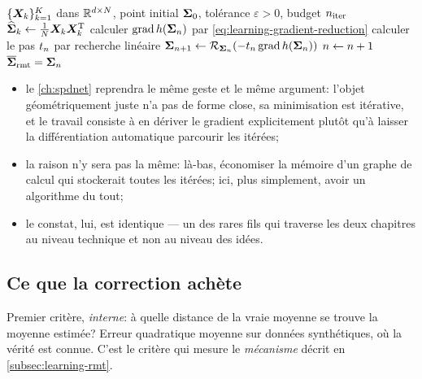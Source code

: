 \begin{algorithm}[htb]
  \caption{Moyenne de Fréchet corrigée par la théorie des matrices aléatoires}
  \label{alg:learning-frechet-rmt}
  \begin{algorithmic}[1]
    \Require $\{\boldsymbol{X}_k\}_{k=1}^{K}$ dans $\mathbb{R}^{d\times N}$,
      point initial $\boldsymbol{\Sigma}_0$, tolérance $\varepsilon>0$, budget $n_{\mathrm{iter}}$
      \State $\widehat{\boldsymbol{\Sigma}}_k\gets\frac{1}{N}\boldsymbol{X}_k\boldsymbol{X}_k^{\mathrm{T}}$
    \EndFor
    \Repeat
      \State calculer $\operatorname{\operatorname{grad}} h(\boldsymbol{\Sigma}_n)$ par
        \cref{eq:learning-gradient-reduction}
      \State calculer le pas $t_n$ par recherche linéaire
      \State $\boldsymbol{\Sigma}_{n+1}\gets\mathcal{R}_{\boldsymbol{\Sigma}_n}\!\left(-t_n\operatorname{\operatorname{grad}} h(\boldsymbol{\Sigma}_n)\right)$
      \State $n\gets n+1$
    \Ensure $\overline{\boldsymbol{\Sigma}}_{\mathrm{rmt}}=\boldsymbol{\Sigma}_n$
  \end{algorithmic}
\end{algorithm}

\begin{remark}
\label{rem:learning-deriver-main}
  \begin{itemize}
    \item le \cref{ch:spdnet} reprendra le même geste et le même argument:
      l'objet géométriquement juste n'a pas de forme close, sa minimisation est
      itérative, et le travail consiste à en dériver le gradient explicitement
      plutôt qu'à laisser la différentiation automatique parcourir les itérées;
    \item la raison n'y sera pas la même: là-bas, économiser la mémoire d'un
      graphe de calcul qui stockerait toutes les itérées; ici, plus simplement,
      avoir un algorithme du tout;
    \item le constat, lui, est identique --- un des rares fils qui traverse les
      deux chapitres au niveau technique et non au niveau des idées.
  \end{itemize}
  \leavevmode
\end{remark}

\subsection{Ce que la correction achète}
\label{subsec:learning-mse}

Premier critère, \emph{interne}: à quelle distance de la vraie moyenne se
trouve la moyenne estimée? Erreur quadratique moyenne sur données synthétiques,
où la vérité est connue. C'est le critère qui mesure le \emph{mécanisme} décrit
en \cref{subsec:learning-rmt}.

